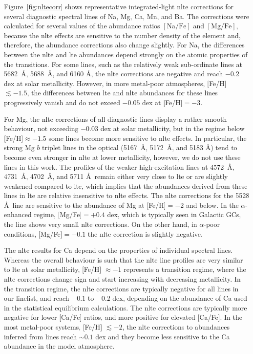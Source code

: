 \documentclass{aa}
\begin{document}
Figure~\ref{fig:nltecorr} shows representative integrated-light \ac{nlte} corrections for several diagnostic spectral lines of Na, Mg, Ca, Mn, and Ba. The corrections were calculated for several values of the abundance ratios $\mathrm{[Na/Fe]}$ and $\mathrm{[Mg/Fe]}$, because the \ac{nlte} effects are sensitive to the number density of the element and, therefore, the abundance corrections also change slightly. For Na, the differences between the \ac{nlte} and \ac{lte} abundances depend strongly on the atomic properties of the transitions. For some lines, such as the relatively weak sub-ordinate lines at 5682~\AA, 5688~\AA, and 6160 \AA, the \ac{nlte} corrections are negative and reach $-0.2$ dex at solar metallicity. However, in more metal-poor atmospheres, [Fe/H] $\lesssim -1.5$, the differences between \ac{lte} and \ac{nlte} abundances for these lines progressively vanish and do not exceed $-0.05$ dex at [Fe/H]$=-3$. 

For Mg, the \ac{nlte} corrections of all diagnostic lines display a rather smooth behaviour, not exceeding $-0.03$ dex at solar metallicity, but in the regime below [Fe/H]$\approx -1.5$ some lines become more sensitive to \ac{nlte} effects. In particular, the strong Mg $b$ triplet lines in the optical (5167~\AA, 5172~\AA, and 5183 \AA) tend to become even stronger in \ac{nlte} at lower metallicity, however, we do not use these lines in this work.
The profiles of the weaker high-excitation lines at 4572~\AA, 4731~\AA, 4702~\AA, and 5711 \AA~remain either very close to \ac{lte} or are slightly weakened compared to \ac{lte}, which implies that the abundances derived from these lines in \ac{lte} are relative insensitive to \ac{nlte} effects. The \ac{nlte} corrections for the 5528 \AA~line are sensitive to the abundance of Mg at [Fe/H]$=-2$ and below. In the $\alpha$-enhanced regime, [Mg/Fe]$=+0.4$ dex, which is typically seen in Galactic GCs, the line shows very small \ac{nlte} corrections. On the other hand, in $\alpha$-poor conditions, [Mg/Fe]$=-0.1$ the \ac{nlte} correction is slightly negative. 

The \ac{nlte} results for Ca depend on the properties of individual spectral lines. Whereas the overall behaviour is such that the \ac{nlte} line profiles are very similar to \ac{lte} at solar metallicity, [Fe/H] $\approx -1$ represents a transition regime, where the \ac{nlte} corrections change sign and start increasing with decreasing metallicity. In the transition regime, the \ac{nlte} corrections are typically negative for all  lines in our linelist, and reach $-0.1$ to $-0.2$ dex, depending on the abundance of Ca used in the statistical equilibrium calculations. The \ac{nlte} corrections are typically more negative for lower [Ca/Fe] ratios, and more positive for elevated  [Ca/Fe]. In the most metal-poor systems,  [Fe/H] $\lesssim -2$, the \ac{nlte} corrections to abundances inferred from  lines reach $\sim 0.1$ dex and they become less sensitive to the Ca abundance in the model atmosphere.
\end{document}
